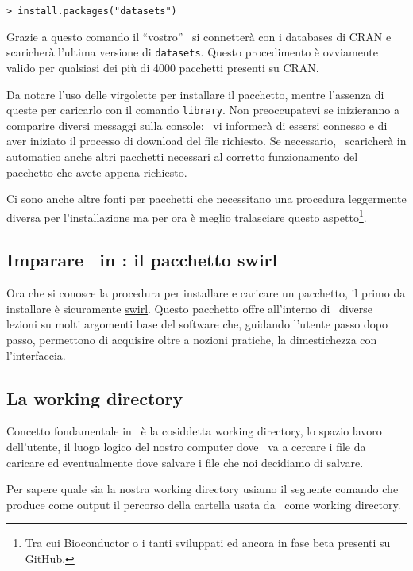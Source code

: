 \begin{lstlisting}
> install.packages("datasets")
\end{lstlisting}

Grazie a questo comando il ``vostro'' \erre\ si connetterà con i databases di CRAN e scaricherà l'ultima versione di \lstinline!datasets!. Questo procedimento è ovviamente valido per qualsiasi dei più di 4000 pacchetti presenti su CRAN.

Da notare l'uso delle virgolette per installare il pacchetto, mentre l'assenza di queste per caricarlo con il comando \lstinline!library!. Non preoccupatevi se inizieranno a comparire diversi messaggi sulla console: \erre\ vi informerà di essersi connesso e di aver iniziato il processo di download del file richiesto. Se necessario, \erre\ scaricherà in automatico anche altri pacchetti necessari al corretto funzionamento del pacchetto che avete appena richiesto.

Ci sono anche altre fonti per pacchetti che necessitano una procedura leggermente diversa per l'installazione ma per ora è meglio tralasciare questo aspetto\footnote{Tra cui Bioconductor o i tanti sviluppati ed ancora in fase beta presenti su GitHub.}.

\subsection{Imparare \erre\ in \erre: il pacchetto swirl}

Ora che si conosce la procedura per installare e caricare un pacchetto, il primo da installare è sicuramente \href{http://swirlstats.com}{swirl}. Questo pacchetto offre all'interno di \erre\ diverse lezioni su molti argomenti base del software che, guidando l'utente passo dopo passo, permettono di acquisire oltre a nozioni pratiche, la dimestichezza con l'interfaccia.

\subsection{La working directory}

Concetto fondamentale in \erre\ è la cosiddetta working directory, lo spazio lavoro dell'utente, il luogo logico del nostro computer dove \erre\ va a cercare i file da caricare ed eventualmente dove salvare i file che noi decidiamo di salvare.

Per sapere quale sia la nostra working directory usiamo il seguente comando che produce come output il percorso della cartella usata da \erre\ come working directory.

